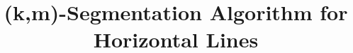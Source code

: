 \documentclass{vldb}
\begin{document}
\title{(k,m)-Segmentation Algorithm for \\Horizontal Lines}

%
%
%
%

\end{document}
